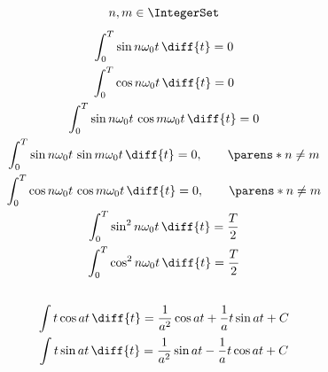 \begin{multicols}{2}
\begin{CheatsheetEntryFrame}
        \begin{gather*}
            n, m \in \IntegerSet
            \\[0.4em]
            \int_0^T \sin{n \omega_0 t} \,\diff{t} = 0
            \\
            \int_0^T \cos{n \omega_0 t} \,\diff{t} = 0
            \\
            \int_0^T \sin{n \omega_0 t} \, \cos{m \omega_0 t} \,\diff{t} = 0
            \\
            \int_0^T \sin{n \omega_0 t} \, \sin{m \omega_0 t} \,\diff{t} = 0
            , \qquad \parens*{n \ne m}
            \\
            \int_0^T \cos{n \omega_0 t} \, \cos{m \omega_0 t} \,\diff{t} = 0
            , \qquad \parens*{n \ne m}
            \\
            \int_0^T \sin^2{n \omega_0 t} \,\diff{t} = \frac{T}{2}
            \\
            \int_0^T \cos^2{n \omega_0 t} \,\diff{t} = \frac{T}{2}
            \\[1.8em]
            \int t \cos{a t} \,\diff{t}
            = \frac{1}{a^2} \cos{a t} + \frac{1}{a} t \sin{a t} + C
            \\
            \int t \sin{a t} \,\diff{t}
            = \frac{1}{a^2} \sin{a t} - \frac{1}{a} t \cos{a t} + C
        \end{gather*}

    \end{CheatsheetEntryFrame}
    
\end{multicols}
\newpage
